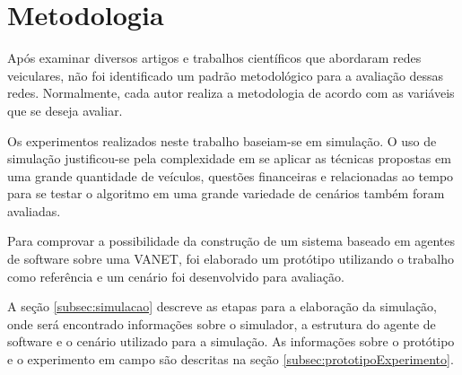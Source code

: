 \section{Metodologia}

Após examinar diversos artigos e trabalhos científicos que abordaram redes veiculares, não foi identificado um padrão metodológico para a avaliação dessas redes. Normalmente, cada autor realiza a metodologia de acordo com as variáveis que se deseja avaliar. 

Os experimentos realizados neste trabalho baseiam-se em simulação. O uso de simulação justificou-se pela complexidade em se aplicar as técnicas propostas em uma grande quantidade de veículos, questões financeiras e relacionadas ao tempo para se testar o algoritmo em uma grande variedade de cenários também foram avaliadas.

Para comprovar a possibilidade da construção de um sistema baseado em agentes de software sobre uma VANET, foi elaborado um protótipo utilizando o trabalho \cite{santanaMestrado:2014} como referência e um cenário foi desenvolvido para avaliação.

A seção \ref{subsec:simulacao} descreve as etapas para a elaboração da simulação, onde será encontrado informações sobre o simulador, a estrutura do agente de software e o cenário utilizado para a simulação. As informações sobre o protótipo e o experimento em campo são descritas na seção \ref{subsec:prototipoExperimento}.






